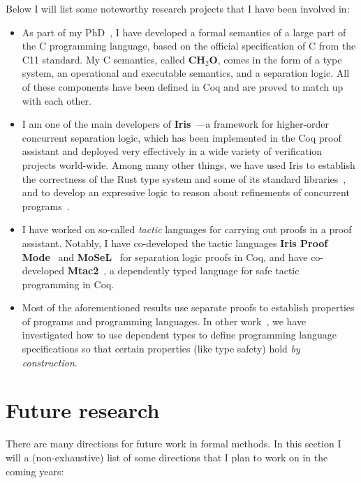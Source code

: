 \documentclass[sigplan]{acmart}
\begin{document}
Below I will list some noteworthy research projects that I have been involved
in:
\begin{itemize}
\item As part of my PhD~\cite{nonlocal,expressions,phdthesis}, I have developed a formal
  semantics of a large part of the C programming language, based on the
  official specification of C from the C11 standard.
  My C semantics, called \textbf{CH\(_2\)O}, comes in the form of a type system, an operational and
  executable semantics, and a separation logic.
  All of these components have been defined in Coq and are proved to match up
  with each other.
\item I am one of the main developers of
  \textbf{Iris}~\cite{iris2,iris3,iris_ground_up}---a framework for higher-order
  concurrent separation logic, which has been implemented in the Coq proof
  assistant and deployed very effectively in a wide variety of verification
  projects world-wide.
  Among many other things, we have used Iris to establish the correctness of the
  Rust type system and some of its standard libraries~\cite{rustbelt}, and to
  develop an expressive logic to reason about refinements of concurrent programs~\cite{reloc}.
\item I have worked on so-called \emph{tactic} languages for carrying out proofs in a proof assistant.
  Notably, I have co-developed the tactic languages \textbf{Iris Proof Mode}~\cite{proofmode} and \textbf{MoSeL}~\cite{mosel} for separation logic proofs in Coq, and have co-developed \textbf{Mtac2}~\cite{mtac2}, a dependently typed language for safe tactic programming in Coq.
\item Most of the aforementioned results use separate proofs to establish
  properties of programs and programming languages.
  In other work~\cite{autosound}, we have investigated how to use dependent types
  to define programming language specifications so that certain properties (like
  type safety) hold \emph{by construction}.
\end{itemize}

\section{Future research}

There are many directions for future work in formal methods. In this section
I will a (non-exhaustive) list of some directions that I plan to work on in the
coming years:
\end{document}
